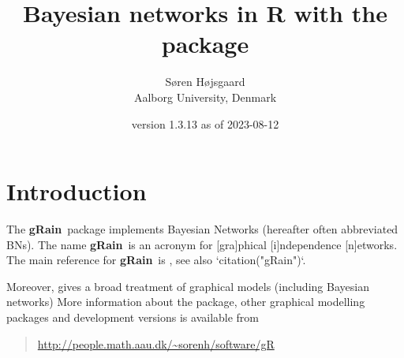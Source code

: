 \documentclass[10pt]{article}\usepackage[]{graphicx}\usepackage[]{xcolor}
\author{S{\o}ren H{\o}jsgaard\\Aalborg University, Denmark}
\title{Bayesian networks in R with the \pkg{gRain} package}
\date{\pkg{gRain} version 1.3.13 as of 2023-08-12}
\def\grbn{{\bf gRain}}
\begin{document}
\maketitle
\tableofcontents
\parindent0pt\parskip5pt

\section{Introduction}

The \grbn\ package implements Bayesian Networks (hereafter often
abbreviated BNs). The name \grbn\ is an acronym for [gra]phical
[i]ndependence [n]etworks. The main reference for \grbn\  is
\cite{hoj:12}, see also `citation("gRain")`.


Moreover, \cite{hoj:edw:lau:12} gives a broad treatment of graphical
models (including Bayesian networks) More information about the
package, other graphical modelling packages and development versions
is available from

\begin{quote}
\url{http://people.math.aau.dk/~sorenh/software/gR}
\end{quote}






\end{document}

